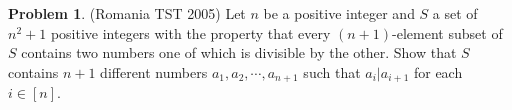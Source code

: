 \documentclass[11pt]{article}
\theoremstyle{definition}
\newtheorem{problem}{Problem}
\begin{document}
	\begin{problem}(Romania TST 2005)
		Let $n$ be a positive integer and $S$ a set of $n^2+1$ positive integers with the property that every $(n+1)$-element subset of $S$ contains two numbers one of which is divisible by the other.
		Show that $S$ contains $n+1$ different numbers $a_1, a_2, \cdots , a_{n+1}$ such that $a_i | a_{i+1}$ for each $i \in [n]$.
	\end{problem}
	
\end{document}
